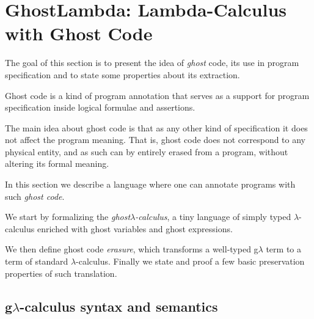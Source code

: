 \section{GhostLambda: Lambda-Calculus with Ghost Code}
%
% 
%   
The goal of this section is to present the idea of \textit{ghost} code,
its use in program specification and to state some properties about its 
extraction.

Ghost code is a kind of program annotation that serves 
as a support for program specification inside logical formulae and assertions.

The main idea about ghost code is that as any other kind of
 specification it does not affect the program meaning. That is, ghost
 code does not correspond to any physical entity, and as such can by entirely erased from a program, without altering its formal meaning. 
 
In this section we describe a language where one can annotate programs 
with such \textit{ghost code}.

We start by formalizing the \textit{ghost}$\lambda$\textit{-calculus}, 
a tiny language of simply typed $\lambda$-calculus enriched with ghost variables and ghost expressions.

We then define ghost code \textit{erasure}, which transforms a well-typed g$\lambda $ term  to a term of standard  $\lambda$-calculus.
Finally we state and proof a few basic preservation properties of such translation.

\subsection{g$\lambda$-calculus syntax and semantics}




